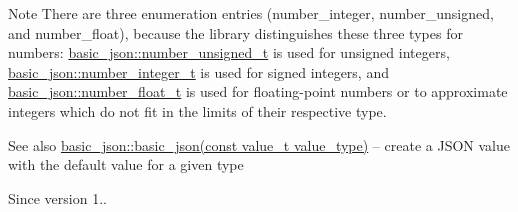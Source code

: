\begin{DoxyNote}{Note}
There are three enumeration entries (number\+\_\+integer, number\+\_\+unsigned, and number\+\_\+float), because the library distinguishes these three types for numbers\+: \hyperlink{classnlohmann_1_1basic__json_ae09af9c23351b7245d9be4d1b2035fef}{basic\+\_\+json\+::number\+\_\+unsigned\+\_\+t} is used for unsigned integers, \hyperlink{classnlohmann_1_1basic__json_a11e390944da90db83089eb2426a749d3}{basic\+\_\+json\+::number\+\_\+integer\+\_\+t} is used for signed integers, and \hyperlink{classnlohmann_1_1basic__json_a5b8abaebd922d82d69756327c0c347e6}{basic\+\_\+json\+::number\+\_\+float\+\_\+t} is used for floating-\/point numbers or to approximate integers which do not fit in the limits of their respective type.
\end{DoxyNote}
\begin{DoxySeeAlso}{See also}
\hyperlink{classnlohmann_1_1basic__json_a19734fbc9c97d536832892ddacd6b62a}{basic\+\_\+json\+::basic\+\_\+json(const value\+\_\+t value\+\_\+type)} -- create a J\+S\+ON value with the default value for a given type
\end{DoxySeeAlso}
\begin{DoxySince}{Since}
version 1.. 
\end{DoxySince}
